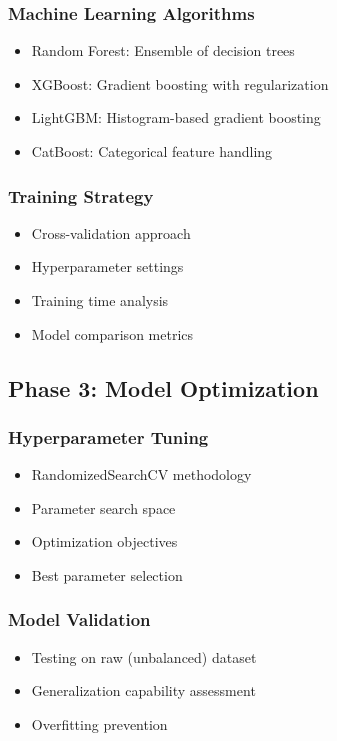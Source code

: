 \documentclass[conference]{IEEEtran}
\begin{document}
\subsubsection{Machine Learning Algorithms}
\begin{itemize}
    \item Random Forest: Ensemble of decision trees
    \item XGBoost: Gradient boosting with regularization
    \item LightGBM: Histogram-based gradient boosting
    \item CatBoost: Categorical feature handling
\end{itemize}

\subsubsection{Training Strategy}
\begin{itemize}
    \item Cross-validation approach
    \item Hyperparameter settings
    \item Training time analysis
    \item Model comparison metrics
\end{itemize}

\subsection{Phase 3: Model Optimization}

\subsubsection{Hyperparameter Tuning}
\begin{itemize}
    \item RandomizedSearchCV methodology
    \item Parameter search space
    \item Optimization objectives
    \item Best parameter selection
\end{itemize}

\subsubsection{Model Validation}
\begin{itemize}
    \item Testing on raw (unbalanced) dataset
    \item Generalization capability assessment
    \item Overfitting prevention
\end{itemize}
\end{document}
